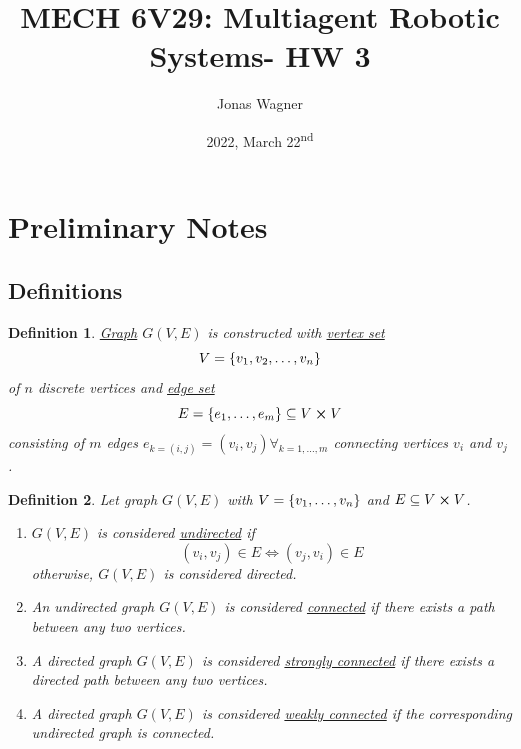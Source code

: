 \documentclass[]{article}
\title{MECH 6V29: Multiagent Robotic Systems- HW 3}
\author{Jonas Wagner}
\date{2022, March 22\textsuperscript{nd}}
\numberwithin{equation}{section}
\newtheorem{definition}{Definition}
\begin{document}
	

\maketitle

\tableofcontents

\newpage
\section*{Preliminary Notes}

\subsection{Definitions}
\begin{definition} \label{def:graph_def}
	\underline{\emph{Graph}} $G(V,E)$ is constructed with \underline{\emph{vertex set}} \[
		V = \qty{v_1,v_2,\dots,v_n}
	\] of $n$ discrete vertices and \emph{\underline{edge set}} \[
		E = \qty{e_1, \dots, e_m} \subseteq V \cross V
	\] consisting of $m$ edges $e_{k=(i,j)} = (v_i,v_j) \forall_{k=1,\dots,m}$ connecting vertices $v_i$ and $v_j$.
\end{definition}

\begin{definition} \label{def:graph_properties}
	Let graph $G(V,E)$ with $V = \qty{v_1,\dots,v_n}$ and $E \subseteq V \cross V$.
	\begin{enumerate}
		\item $G(V,E)$ is considered \underline{\emph{undirected}} if\[
			(v_i,v_j) \in E \iff (v_j,v_i) \in E
		\] otherwise, $G(V,E)$ is considered \emph{directed}.
		\item An undirected graph $G(V,E)$ is considered \underline{\emph{connected}} if there exists a path between any two vertices.
		\item A directed graph $G(V,E)$ is considered \underline{\emph{strongly connected}} if there exists a directed path between any two vertices.
		\item A directed graph $G(V,E)$ is considered \underline{\emph{weakly connected}} if the corresponding undirected graph is connected.
	\end{enumerate}
\end{definition}
\end{document}
